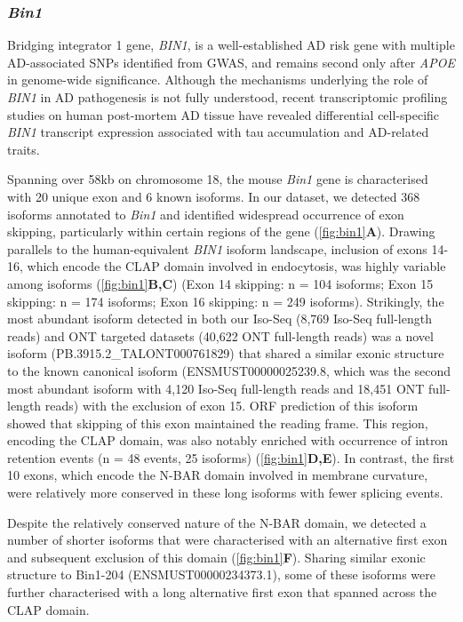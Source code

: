 \newpage
\subsubsection{\textit{Bin1}}
\label{ch5: bin1_annotation}
Bridging integrator 1 gene, \textit{BIN1}, is a well-established AD risk gene with multiple AD-associated SNPs identified from GWAS, and remains second only after \textit{APOE} in genome-wide significance\cite{Kunkle2019}. Although the mechanisms underlying the role of \textit{BIN1} in AD pathogenesis is not fully understood, recent transcriptomic profiling studies on human post-mortem AD tissue have revealed differential cell-specific \textit{BIN1} transcript expression associated with tau accumulation and AD-related traits\cite{Taga2020}. 

Spanning over 58kb on chromosome 18, the mouse \textit{Bin1} gene is characterised with 20 unique exon and 6 known isoforms. In our dataset, we detected 368 isoforms annotated to \textit{Bin1} and identified widespread occurrence of exon skipping, particularly within certain regions of the gene (\cref{fig:bin1}\textbf{A}). Drawing parallels to the human-equivalent \textit{BIN1} isoform landscape\cite{Taga2020}, inclusion of exons 14-16, which encode the CLAP domain involved in endocytosis, was highly variable among isoforms (\cref{fig:bin1}\textbf{B,C}) (Exon 14 skipping: n = 104 isoforms; Exon 15 skipping: n = 174 isoforms; Exon 16 skipping: n = 249 isoforms). Strikingly, the most abundant isoform detected in both our Iso-Seq (8,769 Iso-Seq full-length reads) and ONT targeted datasets (40,622 ONT full-length reads) was a novel isoform (PB.3915.2\_TALONT000761829) that shared a similar exonic structure to the known canonical isoform (ENSMUST00000025239.8, which was the second most abundant isoform with 4,120 Iso-Seq full-length reads and 18,451 ONT full-length reads) with the exclusion of exon 15. ORF prediction of this isoform showed that skipping of this exon maintained the reading frame. This region, encoding the CLAP domain, was also notably enriched with occurrence of intron retention events (n = 48 events, 25 isoforms) (\cref{fig:bin1}\textbf{D,E}). In contrast, the first 10 exons, which encode the N-BAR domain involved in membrane curvature, were relatively more conserved in these long isoforms with fewer splicing events. 

Despite the relatively conserved nature of the N-BAR domain, we detected a number of shorter isoforms that were characterised with an alternative first exon and subsequent exclusion of this domain (\cref{fig:bin1}\textbf{F}). Sharing similar exonic structure to Bin1-204 (ENSMUST00000234373.1), some of these isoforms were further characterised with a long alternative first exon that spanned across the CLAP domain. 

